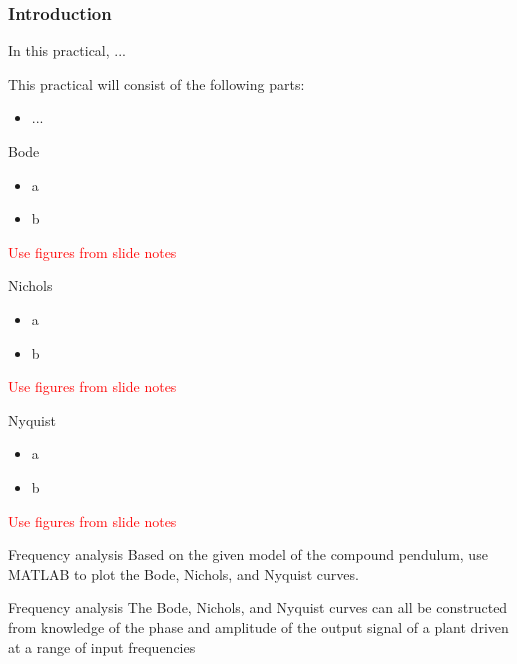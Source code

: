 \documentclass[9pt]{beamer-control}
\begin{document}

\begin{frame}
\frametitle{Introduction}
In this practical, ...

\vfill

This practical will consist of the following parts:
\begin{itemize}
\item ...
\end{itemize}
\end{frame}


\begin{frame}{Bode}
\begin{itemize}
\item a
\item b
\end{itemize}
\textcolor{red}{Use figures from slide notes}
\end{frame}

\begin{frame}{Nichols}
	\begin{itemize}
		\item a
		\item b
	\end{itemize}
\textcolor{red}{Use figures from slide notes}
\end{frame}

\begin{frame}{Nyquist}
	\begin{itemize}
		\item a
		\item b
	\end{itemize}
\textcolor{red}{Use figures from slide notes}
\end{frame}


\begin{frame}{Frequency analysis}
Based on the given model of the compound pendulum, use MATLAB to plot the Bode, Nichols, and Nyquist curves.
\end{frame}


\begin{frame}{Frequency analysis}
The Bode, Nichols, and Nyquist curves can all be constructed from knowledge of the phase and amplitude of the output signal of a plant driven at a range of input frequencies

\end{frame}


\SUMMARYFRAME
\end{document}
